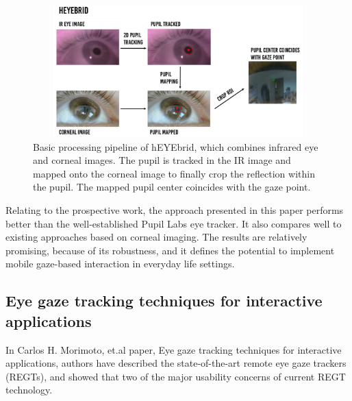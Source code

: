 \begin{figure}[!hbt]
  \centering
  \includegraphics[width=4.5in,height=2in]{lander2.png}
  \caption{Basic processing pipeline of hEYEbrid, which combines infrared eye and corneal images. The pupil is tracked in the IR image and mapped onto the corneal image to finally crop the reflection within the pupil. The mapped pupil center coincides with the gaze point.}
  \label{lander2}
\end{figure}


Relating to the prospective work, the approach presented in this paper performs better than the well-established Pupil Labs eye tracker. It also compares well to existing approaches based on corneal imaging. The results are relatively promising, because of its robustness, and it defines the potential to implement mobile gaze-based interaction in everyday life settings.


\subsection{Eye gaze tracking techniques for interactive applications}

In Carlos H. Morimoto, et.al \cite{15} paper, Eye gaze tracking techniques for interactive applications, authors have described the state-of-the-art remote eye gaze trackers (REGTs), and showed that two of the major usability concerns of current REGT technology. 

